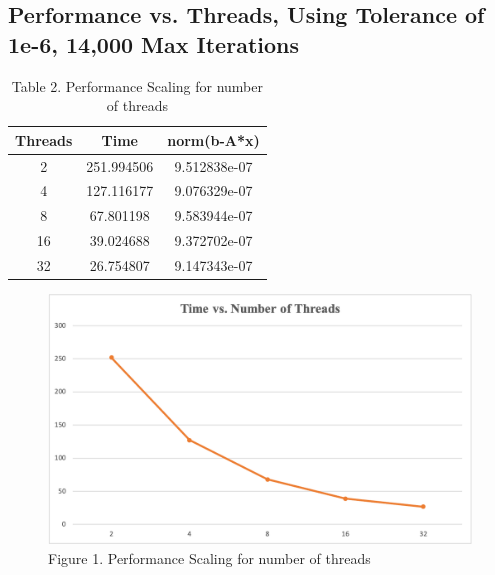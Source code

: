 \documentclass[a4paper,11pt,BCOR10mm,oneside,headsepline]{scrartcl}
\begin{document}
	\subsection{Performance vs. Threads, Using Tolerance of 1e-6, 14,000 Max Iterations}
	\begin{table}[!htbp]
		\centering
		\begin{tabular}{|c|c|c|}
			\hline
			\textbf{Threads} & \textbf{Time} & \textbf{norm(b-A*x)} \\ \hline
			2                & 251.994506        &  9.512838e-07        \\ \hline
			4               & 127.116177    & 9.076329e-07         \\ \hline
			8               & 67.801198     &  9.583944e-07       \\ \hline
			16              & 39.024688   & 9.372702e-07         \\ \hline
			32               & 26.754807    & 9.147343e-07         \\ \hline
		\end{tabular}
		\caption*{Table 2. Performance Scaling for number of threads}
	\end{table}

	\begin{figure}[!htbp]
		\centering
		\includegraphics[scale=0.5]{plot1}
		\caption*{Figure 1. Performance Scaling for number of threads}
	\end{figure}
	
	\newpage
\end{document}
